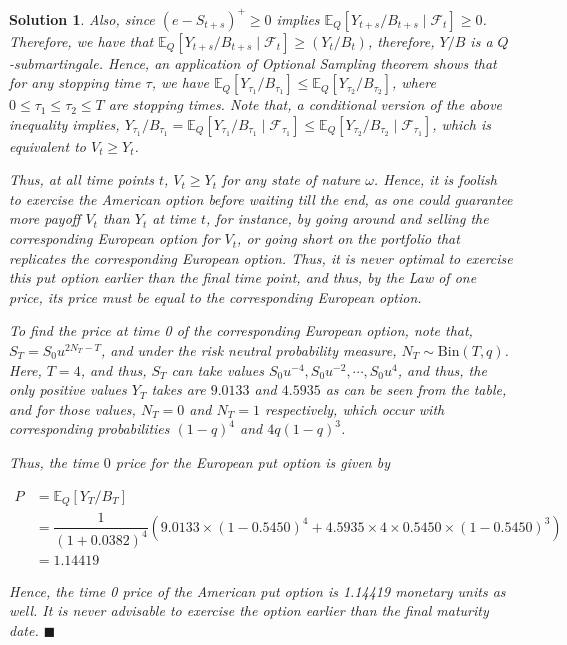 \documentclass[12pt]{article}
\theoremstyle{problemstyle}
\newtheorem*{solution*}{Solution}
\newcommand{\E}{\mathbb{E}}
\begin{document}
\begin{solution*}
Also, since $(e - S_{t+s})^+ \geq 0$ implies $\E_Q\left[ Y_{t+s} / B_{t+s} \mid \mathcal{F}_t \right] \geq 0$. Therefore, we have that $\E_Q\left[ Y_{t+s} / B_{t+s} \mid \mathcal{F}_t \right] \geq (Y_t / B_t)$, therefore, $Y/B$ is a $Q$-submartingale. Hence, an application of Optional Sampling theorem shows that for any stopping time $\tau$, we have $\E_Q\left[ Y_{\tau_1} / B_{\tau_1} \right] \leq \E_Q\left[ Y_{\tau_2} / B_{\tau_2} \right]$, where $0 \leq \tau_1 \leq \tau_2 \leq T$ are stopping times. Note that, a conditional version of the above inequality implies, $Y_{\tau_1} / B_{\tau_1} = \E_Q\left[ Y_{\tau_1} / B_{\tau_1} \mid \mathcal{F}_{\tau_1} \right] \leq \E_Q\left[ Y_{\tau_2} / B_{\tau_2} \mid \mathcal{F}_{\tau_1} \right]$, which is equivalent to $V_t \geq Y_t$. 

Thus, at all time points $t$, $V_t\geq Y_t$ for any state of nature $\omega$. Hence, it is foolish to exercise the American option before waiting till the end, as one could guarantee more payoff $V_t$ than $Y_t$ at time $t$, for instance, by going around and selling the corresponding European option for $V_t$, or going short on the portfolio that replicates the corresponding European option. Thus, it is never optimal to exercise this put option earlier than the final time point, and thus, by the Law of one price, its price must be equal to the corresponding European option. 

To find the price at time 0 of the corresponding European option, note that, $S_T = S_0u^{2N_T - T}$, and under the risk neutral probability measure, $N_T\sim \text{Bin}(T, q)$. Here, $T = 4$, and thus, $S_T$ can take values $S_0u^{-4}, S_0u^{-2}, \cdots, S_0 u^4$, and thus, the only positive values $Y_T$ takes are $9.0133$ and $4.5935$ as can be seen from the table, and for those values, $N_T = 0$ and $N_T = 1$ respectively, which occur with corresponding probabilities $(1-q)^4$ and $4q(1-q)^3$. 

Thus, the time $0$ price for the European put option is given by 

\begin{align*}
    P & = \E_Q[Y_T/B_T]\\
    & = \dfrac{1}{(1+ 0.0382)^4} \left(9.0133\times (1 - 0.5450)^4 + 4.5935\times 4\times 0.5450\times (1 - 0.5450)^3 \right)\\
    & = 1.14419    
\end{align*}


Hence, the time 0 price of the American put option is 1.14419 monetary units as well. It is never advisable to exercise the option earlier than the final maturity date. \hfill $\blacksquare$

\end{solution*}
\end{document}
